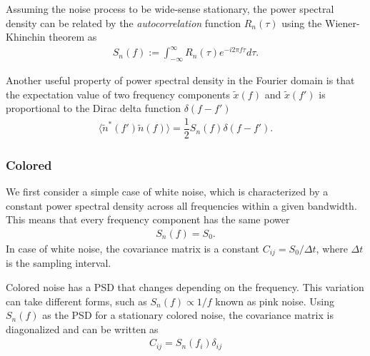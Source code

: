 Assuming the noise process to be wide-sense stationary, the power spectral density can be related by the \textit{autocorrelation} function $R_n(\tau)$ using the Wiener-Khinchin theorem as
\begin{align}
    S_n(f) := \int_{-\infty}^{\infty} R_n(\tau)e^{- i2\pi f\tau} d\tau.
    \label{Eq:Weiner-Khinchin}
\end{align}

Another useful property of power spectral density in the Fourier domain is that the expectation value of two frequency components $\tilde{x}(f)$ and  $\tilde{x}(f')$ is proportional to the Dirac delta function $\delta(f-f')$
\begin{align}
    \langle \tilde{n}^*(f') \tilde{n}(f) \rangle = \dfrac{1}{2}S_n(f)\delta(f-f').
    \label{Eq:PSD-prop-fourier}
\end{align}


\subsubsection{Colored}
We first consider a simple case of white noise, which is characterized by a constant power spectral density across all frequencies within a given bandwidth. This means that every frequency component has the same power
\begin{align}
    S_n(f) = S_0.
\end{align}
In case of white noise, the covariance matrix is a constant $C_{ij} = S_0/\Delta t$, where $\Delta t$ is the sampling interval.

Colored noise has a PSD that changes depending on the frequency. This variation can take different forms, such as $S_n(f) \propto 1/f$ known as pink noise. Using $S_n(f)$ as the PSD for a stationary colored noise, the covariance matrix is diagonalized and can be written as
\begin{align}
    C_{ij} = S_n(f_i)\delta_{ij}
    \label{Eq:Colored-noise-PSD}
\end{align}
 
